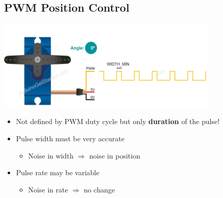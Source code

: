 \documentclass[10pt]{article}
\begin{document}
\subsection*{PWM Position Control}
\begin{center} 
	\includegraphics*[width=0.8\textwidth]{L2_19.png} 
\end{center}
\begin{itemize}
	\item Not defined by PWM duty cycle but only \textbf{duration} of the pulse!
	\item Pulse width must be very accurate
	\begin{itemize}
        \item Noise in width $\Rightarrow$ noise in position
    \end{itemize}
    \item Pulse rate may be variable
    \begin{itemize}
        \item Noise in rate $\Rightarrow$ no change
    \end{itemize}
\end{itemize}
\end{document}
